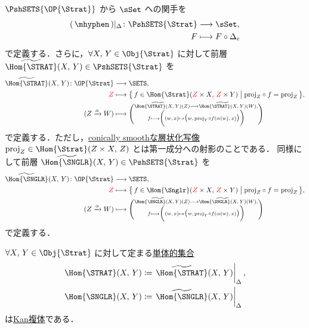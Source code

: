 \documentclass[TQFT_main]{subfiles}
\begin{document}
$\PshSETS{\OP{\Strat}}$ から $\sSet$ への関手を
\begin{align}
    (\, \mhyphen \,)|_{\Delta} \colon \PshSETS{\Strat} &\lto \sSet, \\
    F &\lmto F \circ \Delta_e
\end{align}
で定義する．さらに，$\forall X,\, Y \in \Obj{\Strat}$ に対して前層 $\widetilde{\Hom{\STRAT}} (X,\, Y) \in \PshSETS{\Strat}$ を
\begin{align}
    \widetilde{\Hom{\STRAT}} (X,\, Y) \colon \OP{\Strat} &\lto \SETS, \\
    \textcolor{red}{Z} &\lmto \bigl\{\, f \in \Hom{\Strat}(\textcolor{red}{Z} \times X,\, \textcolor{red}{Z} \times Y) \bigm| \mathrm{proj}_Z \circ f = \mathrm{proj}_Z \,\bigr\}, \\
    (Z \xrightarrow{\alpha} W) &\lmto \Biggl(\substack{\widetilde{\Hom{\STRAT}(X,\, Y)}(Z) \lto \widetilde{\Hom{\STRAT}(X,\, Y)}(W), \\ f \lmto \biggl((w,\, x) \mapsto \bigl(w,\, \mathrm{proj}_Y \circ f (\alpha(w),\, x)\bigr)\biggr)}\Biggr)
\end{align}
で定義する．ただし，\hyperref[def:c-smooth-map]{conically smoothな層状化写像} $\mathrm{proj}_Z \in \Hom{\Strat}(Z \times X,\, Z)$ とは第一成分への射影のことである．
同様にして前層 $\widetilde{\Hom{\SNGLR}} (X,\, Y) \in \PshSETS{\Strat}$ を
\begin{align}
    \widetilde{\Hom{\SNGLR}} (X,\, Y) \colon \OP{\Strat} &\lto \SETS, \\
    \textcolor{red}{Z} &\lmto \bigl\{\, f \in \Hom{\Snglr}(\textcolor{red}{Z} \times X,\, \textcolor{red}{Z} \times Y) \bigm| \mathrm{proj}_Z \circ f = \mathrm{proj}_Z \,\bigr\}, \\
    (Z \xrightarrow{\alpha} W) &\lmto \Biggl(\substack{\widetilde{\Hom{\SNGLR}(X,\, Y)}(Z) \lto \widetilde{\Hom{\SNGLR}(X,\, Y)}(W), \\ f \lmto \biggl((w,\, x) \mapsto \bigl(w,\, \mathrm{proj}_Y \circ f (\alpha(w),\, x)\bigr)\biggr)}\Biggr)
\end{align}
で定義する．

\begin{mylem}[label=lem:Kan-enriched]{}
    $\forall X,\, Y \in \Obj{\Strat}$ に対して定まる\hyperref[def:sSet]{単体的集合}
    \begin{align}
        \Hom{\STRAT}(X,\, Y) &\coloneqq \eval{\widetilde{\Hom{\STRAT}}(X,\, Y)}_{\Delta}, \\
        \Hom{\SNGLR}(X,\, Y) &\coloneqq \eval{\widetilde{\Hom{\SNGLR}}(X,\, Y)}_{\Delta}
    \end{align}
    は\hyperref[def:KanCplx]{Kan複体}である．
\end{mylem}
\end{document}

